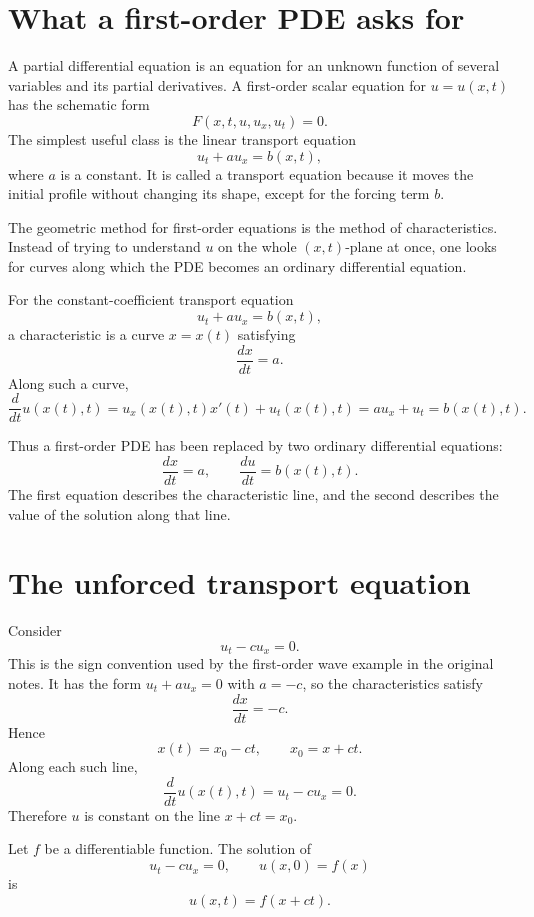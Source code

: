
\section{What a first-order PDE asks for}

A partial differential equation is an equation for an unknown function of several variables and its partial derivatives.  A first-order scalar equation for \(u=u(x,t)\) has the schematic form
\[
  F(x,t,u,u_x,u_t)=0.
\]
The simplest useful class is the linear transport equation
\[
  u_t+a u_x=b(x,t),
\]
where \(a\) is a constant.  It is called a transport equation because it moves the initial profile without changing its shape, except for the forcing term \(b\).

The geometric method for first-order equations is the method of characteristics.  Instead of trying to understand \(u\) on the whole \((x,t)\)-plane at once, one looks for curves along which the PDE becomes an ordinary differential equation.

\begin{definition}
For the constant-coefficient transport equation
\[
  u_t+a u_x=b(x,t),
\]
a characteristic is a curve \(x=x(t)\) satisfying
\[
  \frac{dx}{dt}=a.
\]
Along such a curve,
\[
  \frac{d}{dt}u(x(t),t)=u_x(x(t),t)x'(t)+u_t(x(t),t)=a u_x+u_t=b(x(t),t).
\]
\end{definition}

Thus a first-order PDE has been replaced by two ordinary differential equations:
\[
  \frac{dx}{dt}=a,\qquad \frac{du}{dt}=b(x(t),t).
\]
The first equation describes the characteristic line, and the second describes the value of the solution along that line.

\section{The unforced transport equation}

Consider
\[
  u_t-c u_x=0.
\]
This is the sign convention used by the first-order wave example in the original notes.  It has the form \(u_t+a u_x=0\) with \(a=-c\), so the characteristics satisfy
\[
  \frac{dx}{dt}=-c.
\]
Hence
\[
  x(t)=x_0-ct,\qquad x_0=x+ct.
\]
Along each such line,
\[
  \frac{d}{dt}u(x(t),t)=u_t-c u_x=0.
\]
Therefore \(u\) is constant on the line \(x+ct=x_0\).

\begin{theorem}
Let \(f\) be a differentiable function.  The solution of
\[
  u_t-c u_x=0,\qquad u(x,0)=f(x)
\]
is
\[
  u(x,t)=f(x+ct).
\]
\end{theorem}

